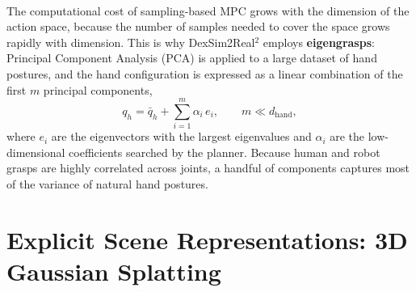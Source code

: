 \documentclass[12pt,a4paper,final]{extreport}
\begin{document}
\paragraph{} The computational cost of sampling-based MPC grows with the dimension of the action space, because the number of samples needed to cover the space grows rapidly with dimension. This is why DexSim2Real$^2$ employs \textbf{eigengrasps}: Principal Component Analysis (PCA) is applied to a large dataset of hand postures, and the hand configuration is expressed as a linear combination of the first $m$ principal components,
\begin{equation}
q_h = \bar{q}_h + \sum_{i=1}^{m} \alpha_i\, e_i, \qquad m \ll d_{\mathrm{hand}},
\label{eq:eigen_general}
\end{equation}
where $e_i$ are the eigenvectors with the largest eigenvalues and $\alpha_i$ are the low-dimensional coefficients searched by the planner. Because human and robot grasps are highly correlated across joints, a handful of components captures most of the variance of natural hand postures.

\section{Explicit Scene Representations: 3D Gaussian Splatting}
\end{document}
